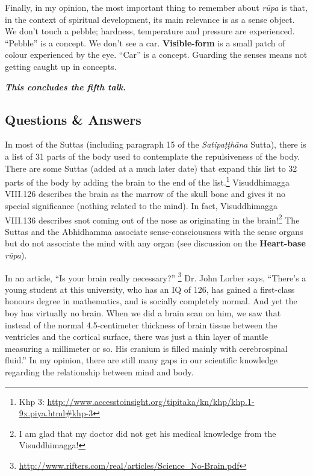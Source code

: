 Finally, in my opinion, the most important thing to remember about \textit{rūpa} is that, in the context of spiritual development, its main relevance is as a sense object. We don’t touch a pebble; hardness, temperature and pressure are experienced. “Pebble” is a concept. We don’t see a car. \textbf{Visible-form} is a small patch of colour experienced by the eye. “Car” is a concept. Guarding the senses means not getting caught up in concepts.

\begin{center}
\textbf{\textit{This concludes the fifth talk.}} \\
\end{center}

\newpage

\subsection*{Questions \& Answers}


In most of the Suttas (including paragraph 15 of the \textit{Satipaṭṭhāna} Sutta), there is a list of 31 parts of the body used to contemplate the repulsiveness of the body. There are some Suttas (added at a much later date) that expand this list to 32 parts of the body by adding the brain to the end of the list.\footnote{Khp 3: \url{http://www.accesstoinsight.org/tipitaka/kn/khp/khp.1-9x.piya.html\#khp-3}} Visuddhimagga VIII.126 describes the brain as the marrow of the skull bone and gives it no special significance (nothing related to the mind). In fact, Visuddhimagga VIII.136 describes snot coming out of the nose as originating in the brain!\footnote{I am glad that my doctor did not get his medical knowledge from the Visuddhimagga! \smiley} The Suttas and the Abhidhamma associate sense-consciousness with the sense organs but do not associate the mind with any organ (see discussion on the \textbf{Heart-base} \textit{rūpa}).

In an article, “Is your brain really necessary?” \footnote{\url{http://www.rifters.com/real/articles/Science\_No-Brain.pdf}} Dr. John Lorber says, “There’s a young student at this university, who has an IQ of 126, has gained a first-class honours degree in mathematics, and is socially completely normal. And yet the boy has virtually no brain. When we did a brain scan on him, we saw that instead of the normal 4.5-centimeter thickness of brain tissue between the ventricles and the cortical surface, there was just a thin layer of mantle measuring a millimeter or so. His cranium is filled mainly with cerebrospinal fluid.” In my opinion, there are still many gaps in our scientific knowledge regarding the relationship between mind and body.

